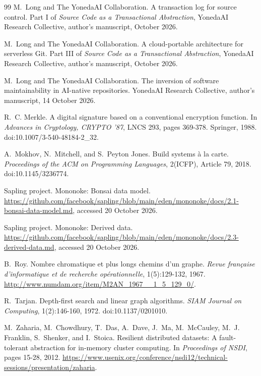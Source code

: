 \documentclass[11pt,letterpaper]{article}
\theoremstyle{definition}
\theoremstyle{remark}
\begin{document}
\begin{thebibliography}{99}
M.~Long and The YonedaAI Collaboration.
\newblock A transaction log for source control.
\newblock Part I of \emph{Source Code as a Transactional Abstraction}, YonedaAI Research Collective, author's manuscript, October 2026.

M.~Long and The YonedaAI Collaboration.
\newblock A cloud-portable architecture for serverless {Git}.
\newblock Part III of \emph{Source Code as a Transactional Abstraction}, YonedaAI Research Collective, author's manuscript, October 2026.

M.~Long and The YonedaAI Collaboration.
\newblock The inversion of software maintainability in {AI}-native repositories.
\newblock YonedaAI Research Collective, author's manuscript, 14 October 2026.

R.~C. Merkle.
\newblock A digital signature based on a conventional encryption function.
\newblock In \emph{Advances in Cryptology, CRYPTO '87}, LNCS 293, pages 369-378. Springer, 1988.
\newblock doi:10.1007/3-540-48184-2\_32.

A.~Mokhov, N.~Mitchell, and S.~Peyton Jones.
\newblock Build systems {\`a} la carte.
\newblock \emph{Proceedings of the ACM on Programming Languages}, 2(ICFP), Article 79, 2018.
\newblock doi:10.1145/3236774.

Sapling project.
\newblock Mononoke: Bonsai data model.
\newblock \url{https://github.com/facebook/sapling/blob/main/eden/mononoke/docs/2.1-bonsai-data-model.md}, accessed 20 October 2026.

Sapling project.
\newblock Mononoke: Derived data.
\newblock \url{https://github.com/facebook/sapling/blob/main/eden/mononoke/docs/2.3-derived-data.md}, accessed 20 October 2026.

B.~Roy.
\newblock Nombre chromatique et plus longs chemins d'un graphe.
\newblock \emph{Revue fran\c{c}aise d'informatique et de recherche op\'erationnelle}, 1(5):129-132, 1967.
\newblock \url{http://www.numdam.org/item/M2AN_1967__1_5_129_0/}.

R.~Tarjan.
\newblock Depth-first search and linear graph algorithms.
\newblock \emph{SIAM Journal on Computing}, 1(2):146-160, 1972.
\newblock doi:10.1137/0201010.

M.~Zaharia, M.~Chowdhury, T.~Das, A.~Dave, J.~Ma, M.~McCauley, M.~J. Franklin, S.~Shenker, and I.~Stoica.
\newblock Resilient distributed datasets: A fault-tolerant abstraction for in-memory cluster computing.
\newblock In \emph{Proceedings of NSDI}, pages 15-28, 2012.
\newblock \url{https://www.usenix.org/conference/nsdi12/technical-sessions/presentation/zaharia}.

\end{thebibliography}
\end{document}
